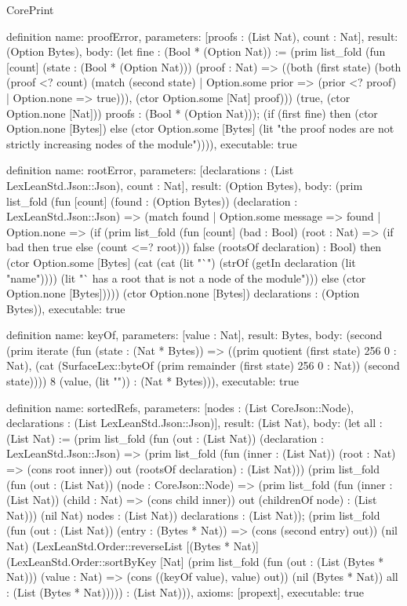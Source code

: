 \begin{lexlean}{CorePrint}
\begin{semanticmodule}
definition{
  name: proofError,
  parameters: [proofs : (List Nat), count : Nat],
  result: (Option Bytes),
  body: (let fine : (Bool * (Option Nat)) := (prim list_fold (fun [count] (state : (Bool * (Option Nat))) (proof : Nat) => ((both (first state) (both (proof <? count) (match (second state)
    | Option.some prior => (prior <? proof)
    | Option.none => true))), (ctor Option.some [Nat] proof))) (true, (ctor Option.none [Nat])) proofs : (Bool * (Option Nat))); (if (first fine) then (ctor Option.none [Bytes]) else (ctor Option.some [Bytes] (lit "the proof nodes are not strictly increasing nodes of the module")))),
  executable: true
}

definition{
  name: rootError,
  parameters: [declarations : (List LexLeanStd.Json::Json), count : Nat],
  result: (Option Bytes),
  body: (prim list_fold (fun [count] (found : (Option Bytes)) (declaration : LexLeanStd.Json::Json) => (match found
    | Option.some message => found
    | Option.none => (if (prim list_fold (fun [count] (bad : Bool) (root : Nat) => (if bad then true else (count <=? root))) false (rootsOf declaration) : Bool) then (ctor Option.some [Bytes] (cat (cat (lit "`") (strOf (getIn declaration (lit "name")))) (lit "` has a root that is not a node of the module"))) else (ctor Option.none [Bytes])))) (ctor Option.none [Bytes]) declarations : (Option Bytes)),
  executable: true
}

definition{
  name: keyOf,
  parameters: [value : Nat],
  result: Bytes,
  body: (second (prim iterate (fun (state : (Nat * Bytes)) => ((prim quotient (first state) 256 0 : Nat), (cat (SurfaceLex::byteOf (prim remainder (first state) 256 0 : Nat)) (second state)))) 8 (value, (lit "")) : (Nat * Bytes))),
  executable: true
}

definition{
  name: sortedRefs,
  parameters: [nodes : (List CoreJson::Node), declarations : (List LexLeanStd.Json::Json)],
  result: (List Nat),
  body: (let all : (List Nat) := (prim list_fold (fun (out : (List Nat)) (declaration : LexLeanStd.Json::Json) => (prim list_fold (fun (inner : (List Nat)) (root : Nat) => (cons root inner)) out (rootsOf declaration) : (List Nat))) (prim list_fold (fun (out : (List Nat)) (node : CoreJson::Node) => (prim list_fold (fun (inner : (List Nat)) (child : Nat) => (cons child inner)) out (childrenOf node) : (List Nat))) (nil Nat) nodes : (List Nat)) declarations : (List Nat)); (prim list_fold (fun (out : (List Nat)) (entry : (Bytes * Nat)) => (cons (second entry) out)) (nil Nat) (LexLeanStd.Order::reverseList [(Bytes * Nat)] (LexLeanStd.Order::sortByKey [Nat] (prim list_fold (fun (out : (List (Bytes * Nat))) (value : Nat) => (cons ((keyOf value), value) out)) (nil (Bytes * Nat)) all : (List (Bytes * Nat))))) : (List Nat))),
  axioms: [propext],
  executable: true
}


\end{semanticmodule}
\end{lexlean}
